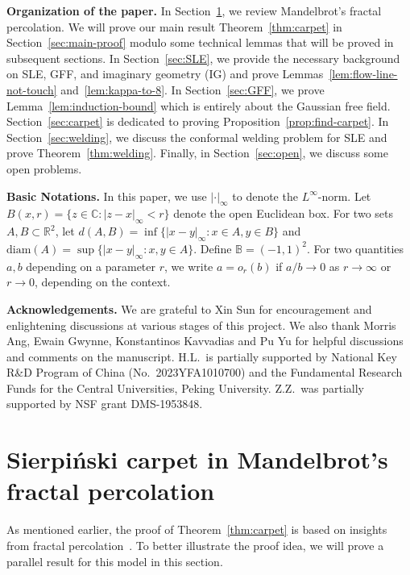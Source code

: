 \documentclass[a4paper]{article}
\numberwithin{equation}{section}
\numberwithin{equation}{section}
\renewcommand{\1}{\mathbf{1}}
\begin{document}
\medskip
\noindent\textbf{Organization of the paper.} In Section~\ref{sec:fractal}, we review Mandelbrot's fractal percolation. We will prove our main result Theorem~\ref{thm:carpet} in Section~\ref{sec:main-proof} modulo some technical lemmas that will be proved in subsequent sections. In Section~\ref{sec:SLE}, we provide the necessary background on SLE, GFF, and imaginary geometry (IG) and prove Lemmas~\ref{lem:flow-line-not-touch} and~\ref{lem:kappa-to-8}. In Section~\ref{sec:GFF}, we prove Lemma~\ref{lem:induction-bound} which is entirely about the Gaussian free field. Section~\ref{sec:carpet} is dedicated to proving Proposition~\ref{prop:find-carpet}. In Section~\ref{sec:welding}, we discuss the conformal welding problem for SLE and prove Theorem~\ref{thm:welding}. Finally, in Section~\ref{sec:open}, we discuss some open problems.

\medskip
\noindent\textbf{Basic Notations.} In this paper, we use $|\cdot|_\infty$ to denote the $L^\infty$-norm. Let $B(x,r) = \{ z \in \mathbb{C}: |z-x|_\infty<r \}$ denote the open Euclidean box.
For two sets $A,B \subset \mathbb R^2$, let $d(A,B)=\inf\{|x-y|_\infty:x \in A, y \in B\}$ and $\mathrm{diam}(A)=\sup\{|x-y|_\infty:x,y \in A\}$. Define $\mathbb{B} = (-1,1)^2$. For two quantities $a,b$ depending on a parameter $r$, we write $a=o_r(b)$ if $a/b \to 0$ as $r \to \infty$ or $r \to 0$, depending on the context.

\medskip
\noindent\textbf{Acknowledgements.} We are grateful to Xin Sun for encouragement and enlightening discussions at various stages of this project. We also thank Morris Ang, Ewain Gwynne, Konstantinos Kavvadias and Pu Yu for helpful discussions and comments on the manuscript. H.L.\ is partially supported by National Key R\&D Program of China (No.\ 2023YFA1010700) and the Fundamental Research Funds for the Central Universities, Peking University. Z.Z.\ was partially supported by NSF grant DMS-1953848.

\section{Sierpi\'nski carpet in Mandelbrot's fractal percolation}
\label{sec:fractal}
As mentioned earlier, the proof of Theorem~\ref{thm:carpet} is based on insights from fractal percolation~\cite{mandelbrot-fractal,CCD-fractal}. To better illustrate the proof idea, we will prove a parallel result for this model in this section.
\end{document}

